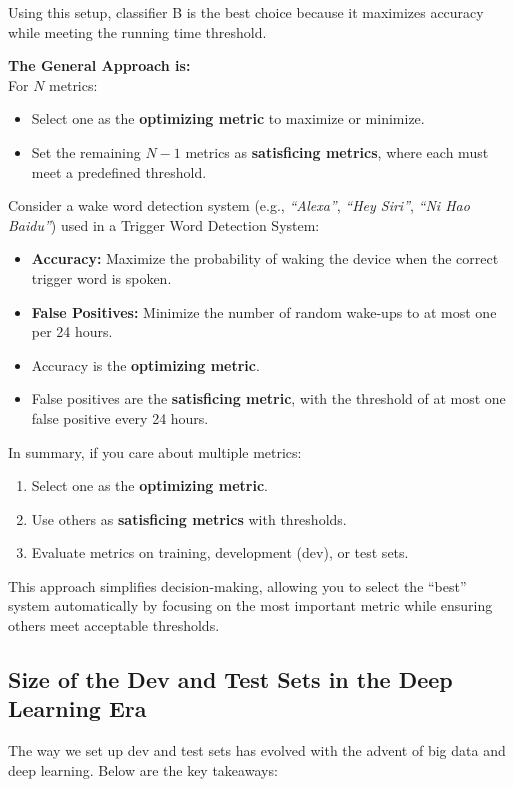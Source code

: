 \documentclass[letterpaper,12pt,notitlepage,twoside]{report}
\begin{document}
Using this setup, classifier B is the best choice because it maximizes accuracy while meeting the running time threshold.

\textbf{The General Approach is:} \\
For \(N\) metrics:
\begin{itemize}[noitemsep, topsep=0pt]
    \item Select one as the \textbf{optimizing metric} to maximize or minimize.
    \item Set the remaining \(N-1\) metrics as \textbf{satisficing metrics}, where each must meet a predefined threshold.
\end{itemize}

Consider a wake word detection system (e.g., \textit{“Alexa”}, \textit{“Hey Siri”}, \textit{“Ni Hao Baidu”}) used in a Trigger Word Detection System:
\begin{itemize}[noitemsep, topsep=0pt]
    \item \textbf{Accuracy:} Maximize the probability of waking the device when the correct trigger word is spoken.
    \item \textbf{False Positives:} Minimize the number of random wake-ups to at most one per 24 hours.
    \item Accuracy is the \textbf{optimizing metric}.
    \item False positives are the \textbf{satisficing metric}, with the threshold of at most one false positive every 24 hours.
\end{itemize}

In summary, if you care about multiple metrics:
\begin{enumerate}[noitemsep, topsep=0pt]
    \item Select one as the \textbf{optimizing metric}.
    \item Use others as \textbf{satisficing metrics} with thresholds.
    \item Evaluate metrics on training, development (dev), or test sets.
\end{enumerate}

This approach simplifies decision-making, allowing you to select the ``best'' system automatically by focusing on the most important metric while ensuring others meet acceptable thresholds.

\subsection{Size of the Dev and Test Sets in the Deep Learning Era}
The way we set up dev and test sets has evolved with the advent of big data and deep learning. Below are the key takeaways:
\end{document}
